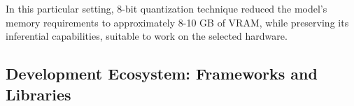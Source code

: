 In this particular setting, 8-bit quantization technique reduced the model’s memory requirements to approximately 8-10 GB of VRAM, while preserving its inferential capabilities, suitable to work on the selected hardware.


\subsection{Development Ecosystem: Frameworks and Libraries}
\label{sec:development-ecosystem}